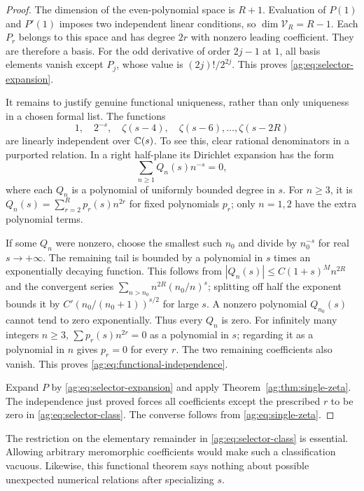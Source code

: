 \documentclass[11pt,letterpaper]{article}
\numberwithin{equation}{section}
\theoremstyle{definition}\newtheorem{definition}[theorem]{Definition}
\theoremstyle{remark}\newtheorem{remark}[theorem]{Remark}
\begin{document}
\begin{proof}
The dimension of the even-polynomial space is $R+1$. Evaluation of
$P(1)$ and $P'(1)$ imposes two independent linear conditions, so
$\dim\mathscr V_R=R-1$. Each $P_r$ belongs to this space and has degree
$2r$ with nonzero leading coefficient. They are therefore a basis.
For the odd derivative of order $2j-1$ at $1$, all basis elements vanish
except $P_j$, whose value is $(2j)!/2^{2j}$. This proves
\eqref{ag:eq:selector-expansion}.

It remains to justify genuine functional uniqueness, rather than only
uniqueness in a chosen formal list. The functions
\begin{equation}\label{ag:eq:functional-independence}
 1,\quad 2^{-s},\quad \zeta(s-4),\quad\zeta(s-6),\ldots,\zeta(s-2R)
\end{equation}
are linearly independent over $\mathbb C(s)$. To see this, clear rational
denominators in a purported relation. In a right half-plane its
Dirichlet expansion has the form
\[
 \sum_{n\ge1}Q_n(s)n^{-s}=0,
\]
where each $Q_n$ is a polynomial of uniformly bounded degree in $s$.
For $n\ge3$, it is
$Q_n(s)=\sum_{r=2}^Rp_r(s)n^{2r}$ for fixed polynomials $p_r$;
only $n=1,2$ have the extra polynomial terms.

If some $Q_n$ were nonzero, choose the smallest such $n_0$ and divide
by $n_0^{-s}$ for real $s\to+\infty$. The remaining tail is bounded by
a polynomial in $s$ times an exponentially decaying function. This
follows from $|Q_n(s)|\le C(1+s)^M n^{2R}$ and the convergent series
$\sum_{n>n_0}n^{2R}(n_0/n)^s$; splitting off half the exponent bounds
it by $C'(n_0/(n_0+1))^{s/2}$ for large $s$.
A nonzero polynomial $Q_{n_0}(s)$ cannot tend to zero exponentially.
Thus every $Q_n$ is zero. For infinitely many integers $n\ge3$,
$\sum p_r(s)n^{2r}=0$ as a polynomial in $s$; regarding it as a
polynomial in $n$ gives $p_r=0$ for every $r$. The two remaining
coefficients also vanish. This proves \eqref{ag:eq:functional-independence}.

Expand $P$ by \eqref{ag:eq:selector-expansion} and apply
Theorem~\ref{ag:thm:single-zeta}. The independence just proved forces
all coefficients except the prescribed $r$ to be zero in
\eqref{ag:eq:selector-class}. The converse follows from
\eqref{ag:eq:single-zeta}.
\end{proof}

The restriction on the elementary remainder in
\eqref{ag:eq:selector-class} is essential. Allowing arbitrary
meromorphic coefficients would make such a classification vacuous.
Likewise, this functional theorem says nothing about possible
unexpected numerical relations after specializing $s$.
\end{document}
